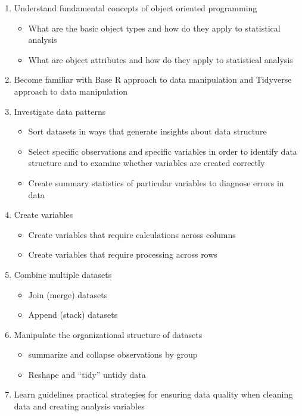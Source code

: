 \documentclass[11pt,]{article}
\providecommand{\tightlist}{%
  \setlength{\itemsep}{0pt}\setlength{\parskip}{0pt}}
\begin{document}
\begin{enumerate}
\def\labelenumi{\arabic{enumi}.}
\tightlist
\item
  Understand fundamental concepts of object oriented programming

  \begin{itemize}
  \tightlist
  \item
    What are the basic object types and how do they apply to statistical
    analysis
  \item
    What are object attributes and how do they apply to statistical
    analysis
  \end{itemize}
\item
  Become familiar with Base R approach to data manipulation and
  Tidyverse approach to data manipulation
\item
  Investigate data patterns

  \begin{itemize}
  \tightlist
  \item
    Sort datasets in ways that generate insights about data structure
  \item
    Select specific observations and specific variables in order to
    identify data structure and to examine whether variables are created
    correctly
  \item
    Create summary statistics of particular variables to diagnose errors
    in data
  \end{itemize}
\item
  Create variables

  \begin{itemize}
  \tightlist
  \item
    Create variables that require calculations across columns
  \item
    Create variables that require processing across rows
  \end{itemize}
\item
  Combine multiple datasets

  \begin{itemize}
  \tightlist
  \item
    Join (merge) datasets
  \item
    Append (stack) datasets
  \end{itemize}
\item
  Manipulate the organizational structure of datasets

  \begin{itemize}
  \tightlist
  \item
    summarize and collapse observations by group
  \item
    Reshape and ``tidy'' untidy data
  \end{itemize}
\item
  Learn guidelines practical strategies for ensuring data quality when
  cleaning data and creating analysis variables
\end{enumerate}
\end{document}
